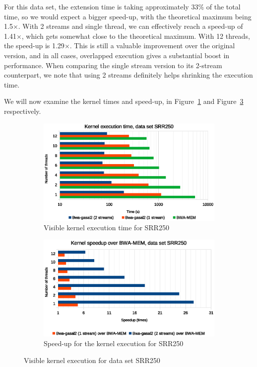 For this data set, the extension time is taking approximately 33\% of the total time, so we would expect a bigger speed-up, with the theoretical maximum being 1.5$\times$. With 2 streams and single thread, we can effectively reach a speed-up of 1.41$\times$, which gets somewhat close to the theoretical maximum. With 12 threads, the speed-up is 1.29$\times$. This is still a valuable improvement over the original version, and in all cases, overlapped execution gives a substantial boost in performance. When comparing the single stream version to its 2-stream counterpart, we note that using 2 streams definitely helps shrinking the execution time.

We will now examine the kernel times and speed-up, in Figure~\ref{fig:kernel-exec-time-srr250} and Figure~\ref{fig:kernel-exec-speed-up-srr250} respectively.


\begin{figure}[p]
	\centering
	\begin{subfigure}[t]{1\textwidth}
		\centering
		\includegraphics[width=1\textwidth]{srr250/kernel-exec-time-srr250}
		\caption{Visible kernel execution time for SRR250}
		\label{fig:kernel-exec-time-srr250}
	\end{subfigure}%
	
	\begin{subfigure}[b]{1\textwidth}
		\centering
		\includegraphics[width=1\textwidth]{srr250/kernel-exec-speed-up-srr250}
		\caption{Speed-up for the kernel execution for SRR250}
		\label{fig:kernel-exec-speed-up-srr250}
	\end{subfigure}
	\caption{Visible kernel execution for data set SRR250}
\end{figure}

